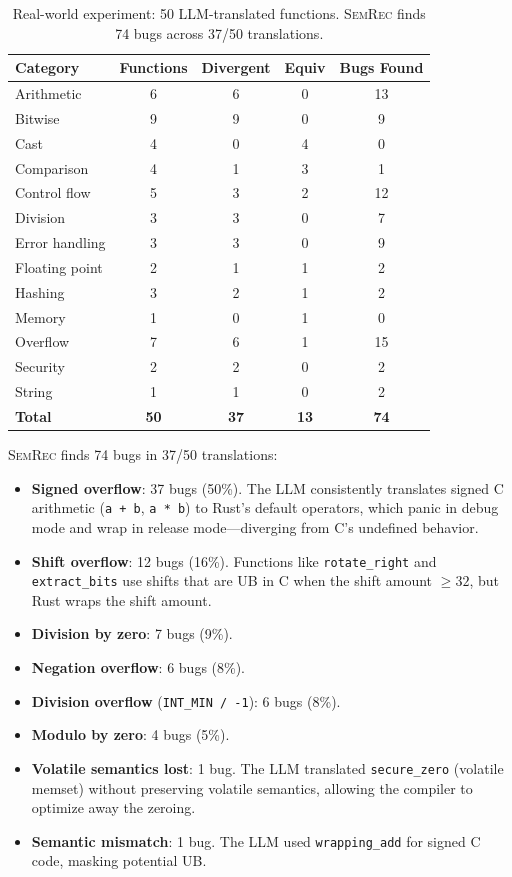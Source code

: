 \documentclass[11pt,a4paper]{article}
\begin{document}
\begin{table}[t]
\centering
\small
\caption{Real-world experiment: 50 LLM-translated functions.
\textsc{SemRec} finds 74 bugs across 37/50 translations.}
\label{tab:realworld}
\begin{tabular}{@{}lcccc@{}}
\toprule
Category & Functions & Divergent & Equiv & Bugs Found \\
\midrule
Arithmetic       & 6 & 6 & 0 & 13 \\
Bitwise          & 9 & 9 & 0 & 9 \\
Cast             & 4 & 0 & 4 & 0 \\
Comparison       & 4 & 1 & 3 & 1 \\
Control flow     & 5 & 3 & 2 & 12 \\
Division         & 3 & 3 & 0 & 7 \\
Error handling   & 3 & 3 & 0 & 9 \\
Floating point   & 2 & 1 & 1 & 2 \\
Hashing          & 3 & 2 & 1 & 2 \\
Memory           & 1 & 0 & 1 & 0 \\
Overflow         & 7 & 6 & 1 & 15 \\
Security         & 2 & 2 & 0 & 2 \\
String           & 1 & 1 & 0 & 2 \\
\midrule
\textbf{Total}   & \textbf{50} & \textbf{37} & \textbf{13} & \textbf{74} \\
\bottomrule
\end{tabular}
\end{table}

\textsc{SemRec} finds 74 bugs in 37/50 translations:
\begin{itemize}
  \item \textbf{Signed overflow}: 37 bugs (50\%).  The LLM consistently
    translates signed C arithmetic (\texttt{a + b}, \texttt{a * b}) to
    Rust's default operators, which panic in debug mode and wrap in release
    mode---diverging from C's undefined behavior.
  \item \textbf{Shift overflow}: 12 bugs (16\%).  Functions like
    \texttt{rotate\_right} and \texttt{extract\_bits}
    use shifts that are UB in C when the
    shift amount $\geq 32$, but Rust wraps the shift amount.
  \item \textbf{Division by zero}: 7 bugs (9\%).
  \item \textbf{Negation overflow}: 6 bugs (8\%).
  \item \textbf{Division overflow} (\texttt{INT\_MIN / -1}): 6 bugs (8\%).
  \item \textbf{Modulo by zero}: 4 bugs (5\%).
  \item \textbf{Volatile semantics lost}: 1 bug.  The LLM translated
    \texttt{secure\_zero} (volatile memset) without preserving volatile
    semantics, allowing the compiler to optimize away the zeroing.
  \item \textbf{Semantic mismatch}: 1 bug.  The LLM used
    \texttt{wrapping\_add} for signed C code, masking potential UB.
\end{itemize}
\end{document}
